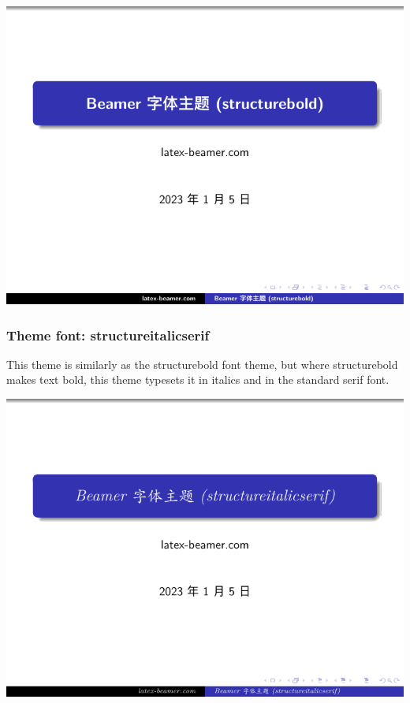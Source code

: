 \includegraphics[page=2]{examples/beamer/beamerfont08.pdf}

\subsubsection{Theme font: {\ttfamily structureitalicserif}}

This theme is similarly as the structurebold font theme, but where structurebold makes text bold, this theme typesets it in italics and in the
standard serif font.

\includegraphics[page=1]{examples/beamer/beamerfont09.pdf}

